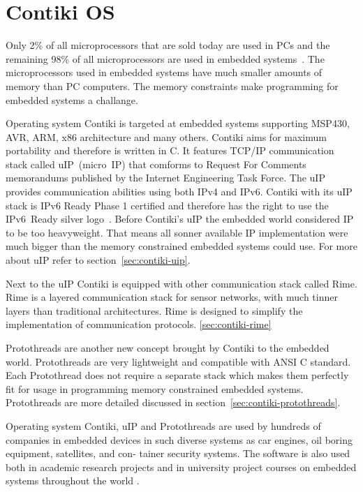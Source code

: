 
\chapter{Contiki OS}
Only 2\% of all microprocessors that are sold today are used in PCs and the remaining 98\%
of all microprocessors are used in embedded systems~\cite{thesis-programming}.
The microprocessors
used in embedded systems have much smaller amounts of memory than PC computers.
The memory constraints make programming for embedded systems a challange.

Operating system Contiki is targeted at embedded systems supporting MSP430, AVR, ARM, x86 architecture and many others.
Contiki aims for maximum portability and therefore is written in C.
It features TCP/IP communication stack called uIP~(micro~IP)
that comforms to Request For Comments memorandums published by the Internet Engineering Task Force.
The uIP provides communication abilities using both IPv4 and IPv6\cite{contiki-docs}.
Contiki with its uIP stack is IPv6 Ready Phase 1 certified
and therefore has the right to use the IPv6~Ready silver logo~\cite{ipv6ready-db}.
Before Contiki's uIP the embedded world considered IP to be too heavyweight.
That means all sonner available IP implementation were much bigger than the memory constrained embedded systems
could use. For more about uIP refer to section~\ref{sec:contiki-uip}.

Next to the uIP Contiki is equipped with other communication stack called Rime.
Rime is a layered communication stack for sensor networks,
with much tinner layers than traditional architectures.
Rime is designed to simplify the implementation of communication
protocols. \ref{sec:contiki-rime}
\!

Protothreads are another new concept brought by Contiki to the embedded world.
Protothreads are very lightweight and compatible with ANSI C standard.
Each Protothread does not require a separate stack which makes them perfectly
fit for usage in programming memory constrained embedded systems.
Protothreads are more detailed discussed in section~\ref{sec:contiki-protothreads}.

Operating system Contiki, uIP and Protothreads are used by hundreds of companies in embedded devices in
such diverse systems as car engines, oil boring equipment, satellites, and con-
tainer security systems. The software is also used both in academic research
projects and in university project courses on embedded systems throughout the
world \cite{thesis-programming}.

